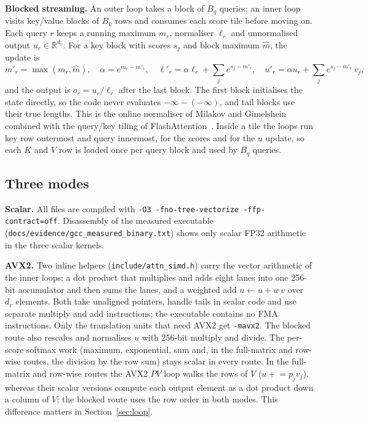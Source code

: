 \documentclass[11pt,a4paper]{article}
\newcommand{\code}[1]{\texttt{#1}}
\newcommand{\Bq}{B_q}
\newcommand{\Bk}{B_k}
\begin{document}
\textbf{Blocked streaming.} An outer loop takes a block of $\Bq$ queries; an inner loop visits key/value blocks of $\Bk$ rows and consumes each score tile before moving on. Each query $r$ keeps a running maximum $m_r$, normaliser $\ell_r$ and unnormalised output $u_r\in\mathbb{R}^{d_v}$. For a key block with scores $s_j$ and block maximum $\hat m$, the update is
\[
m'_r=\max(m_r,\hat m),\quad \alpha=e^{m_r-m'_r},\quad \ell'_r=\alpha\ell_r+\sum_j e^{s_j-m'_r},\quad u'_r=\alpha u_r+\sum_j e^{s_j-m'_r}\,v_j ,
\]
and the output is $o_r=u_r/\ell_r$ after the last block. The first block initialises the state directly, so the code never evaluates $-\infty-(-\infty)$, and tail blocks use their true lengths. This is the online normaliser of Milakov and Gimelshein~\cite{milakov2018} combined with the query/key tiling of FlashAttention~\cite{dao2022}. Inside a tile the loops run key row outermost and query innermost, for the scores and for the $u$ update, so each $K$ and $V$ row is loaded once per query block and used by $\Bq$ queries.

\subsection{Three modes}
\textbf{Scalar.} All files are compiled with \code{-O3 -fno-tree-vectorize -ffp-contract=off}. Disassembly of the measured executable (\code{docs/evidence/gcc\_measured\_binary.txt}) shows only scalar FP32 arithmetic in the three scalar kernels.

\textbf{AVX2.} Two inline helpers (\code{include/attn\_simd.h}) carry the vector arithmetic of the inner loops: a dot product that multiplies and adds eight lanes into one 256-bit accumulator and then sums the lanes, and a weighted add $u\leftarrow u+w\,v$ over $d_v$ elements. Both take unaligned pointers, handle tails in scalar code and use separate multiply and add instructions; the executable contains no FMA instructions. Only the translation units that need AVX2 get \code{-mavx2}. The blocked route also rescales and normalises $u$ with 256-bit multiply and divide. The per-score softmax work (maximum, exponential, sum and, in the full-matrix and row-wise routes, the division by the row sum) stays scalar in every route. In the full-matrix and row-wise routes the AVX2 $PV$ loop walks the rows of $V$ ($u\mathrel{+}=p_j v_j$), whereas their scalar versions compute each output element as a dot product down a column of $V$; the blocked route uses the row order in both modes. This difference matters in Section~\ref{sec:loop}.
\end{document}
